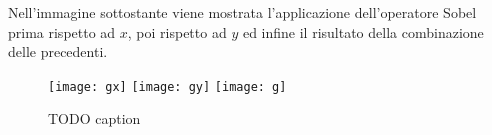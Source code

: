 Nell'immagine sottostante viene mostrata l'applicazione dell'operatore Sobel prima rispetto ad $x$, poi rispetto ad $y$ ed infine il risultato della combinazione delle precedenti.

\begin{figure}[ht] %
  \begin{center}
    \texttt{[image: gx]}
    \texttt{[image: gy]}
    \texttt{[image: g]}
    \label{fig:sobel_example}
    \caption{TODO caption}
  \end{center}
\end{figure}




\clearpage
